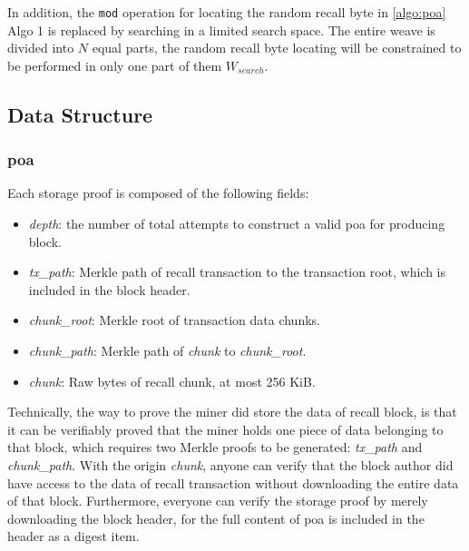 \documentclass[]{article}
\begin{document}
In addition, the \texttt{mod} operation for locating the random recall byte in \ref{algo:poa}{ Algo 1} is replaced by searching in a limited search space. The entire weave is divided into $N$ equal parts, the random recall byte locating will be constrained to be performed in only one part of them $W_{search}$.

\subsection{Data Structure}

\subsubsection{poa}\label{poa}

Each storage proof is composed of the following fields:

\begin{itemize}
    \item \textit{depth}: the number of total attempts to construct a valid poa for producing block.
    \item \textit{tx\_path}: Merkle path of recall transaction to the transaction root, which is included in the block header.
    \item \textit{chunk\_root}: Merkle root of transaction data chunks.
    \item \textit{chunk\_path}: Merkle path of \textit{chunk} to \textit{chunk\_root}.
    \item \textit{chunk}: Raw bytes of recall chunk, at most 256 KiB.
\end{itemize}

Technically, the way to prove the miner did store the data of recall block, is that it can be verifiably proved that the miner holds one piece of data belonging to that block, which requires two Merkle proofs to be generated: \textit{tx\_path} and \textit{chunk\_path}. With the origin \textit{chunk}, anyone can verify that the block author did have access to the data of recall transaction without downloading the entire data of that block. Furthermore, everyone can verify the storage proof by merely downloading the block header, for the full content of poa is included in the header as a digest item.
\end{document}
